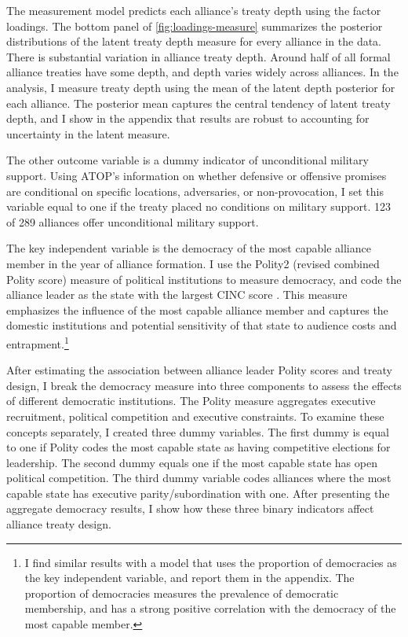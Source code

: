 \documentclass[12pt]{article}
\begin{document}
The measurement model predicts each alliance's treaty depth using the factor loadings. 
The bottom panel of \autoref{fig:loadings-measure} summarizes the posterior distributions of the latent treaty depth measure for every alliance in the data. 
There is substantial variation in alliance treaty depth. 
Around half of all formal alliance treaties have some depth, and depth varies widely across alliances.
In the analysis, I measure treaty depth using the mean of the latent depth posterior for each alliance. 
The posterior mean captures the central tendency of latent treaty depth, and I show in the appendix that results are robust to accounting for uncertainty in the latent measure. 


The other outcome variable is a dummy indicator of unconditional military support. 
Using ATOP's information on whether defensive or offensive promises are conditional on specific locations, adversaries, or non-provocation, I set this variable equal to one if the treaty placed no conditions on military support.
123 of 289 alliances offer unconditional military support. 


The key independent variable is the democracy of the most capable alliance member in the year of alliance formation. 
I use the Polity2 (revised combined Polity score) measure of political institutions to measure democracy, and code the alliance leader as the state with the largest CINC score \citep{SingerCINC1988}.
This measure emphasizes the influence of the most capable alliance member and captures the domestic institutions and potential sensitivity of that state to audience costs and entrapment.\footnote{I find similar results with a model that uses the proportion of democracies as the key independent variable, and report them in the appendix. The proportion of democracies measures the prevalence of democratic membership, and has a strong positive correlation with the democracy of the most capable member.}    


After estimating the association between alliance leader Polity scores and treaty design, I break the democracy measure into three components to assess the effects of different democratic institutions.  
The Polity measure aggregates executive recruitment, political competition and executive constraints. 
To examine these concepts separately, I created three dummy variables. 
The first dummy is equal to one if Polity codes the most capable state as having competitive elections for leadership.
The second dummy equals one if the most capable state has open political competition. 
The third dummy variable codes alliances where the most capable state has executive parity/subordination with one. 
After presenting the aggregate democracy results, I show how these three binary indicators affect alliance treaty design. 
\end{document}
